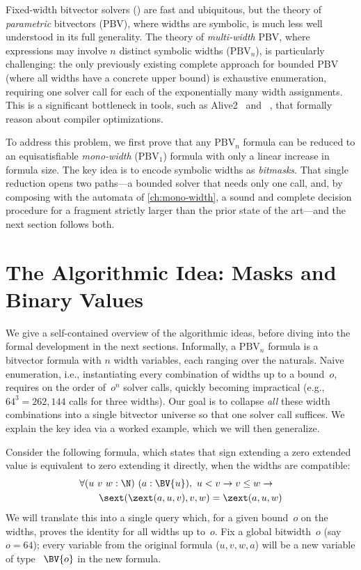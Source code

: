 Fixed-width bitvector solvers (\qfbv{}) are fast and ubiquitous, but the theory
of \emph{parametric} bitvectors
(PBV), where widths are symbolic, is much less well understood in its full
generality. The theory of \emph{multi-width} PBV, where expressions may
involve $n$ distinct symbolic widths ($\text{PBV}_n$), is particularly
challenging: the only previously existing complete approach for bounded PBV
(where all widths have a concrete upper bound) is exhaustive enumeration,
requiring one \qfbv{} solver call for each of the exponentially many width
assignments. This is a significant bottleneck in tools, such as
Alive2~\citep{lopes2021alive2} and \hydra{}~\citep{hydra}, that
formally reason about compiler optimizations.

To address this problem, we first prove that any $\text{PBV}_n$ formula can be
reduced to an equisatisfiable \emph{mono-width} ($\text{PBV}_1$) formula with
only a linear increase in formula size. The key idea is to encode symbolic
widths as \emph{bitmasks}. That single reduction opens two paths---a bounded
solver that needs only one \qfbv{} call, and, by composing with the automata of
\cref{ch:mono-width}, a sound and complete decision procedure for a fragment
strictly larger than the prior state of the art---and the next section follows
both.

\section{The Algorithmic Idea: Masks and Binary Values}
\label{sec:mwbv:idea}

We give a self-contained overview of the algorithmic ideas, before diving into
the formal development in the next sections.
%
Informally, a $\text{PBV}_n$ formula is a bitvector formula with $n$ width
variables, each ranging over the naturals. Naive enumeration, i.e.,
instantiating every combination of widths up to a bound~$o$, requires on the
order of~$o^n$ solver calls, quickly becoming impractical (e.g., $64^3 =
262{,}144$ calls for three widths). Our goal is to collapse \emph{all} these
width combinations into a single bitvector universe so that one solver call
suffices. We explain the key idea via a worked example, which we will then
generalize.

Consider the following formula, which states that sign extending a
zero extended value is equivalent to zero extending it directly, when
the widths are compatible:
\[
\begin{aligned}
  &\forall (u~v~w : \N)~(a : \BV{u}),~ u < v \to v \leq w \to\\
  &\qquad \sext(\zext(a, u, v), v, w) = \zext(a, u, w)
\end{aligned}
\]
We will translate this into a single \qfbv{} query which, for a given bound~$o$
on the widths, proves the identity for all widths up to~$o$.
%
Fix a global bitwidth~$o$ (say $o = 64$); every variable from the original
formula ($u, v, w, a$) will be a new variable of type ~$\BV{o}$ in the new
formula.

